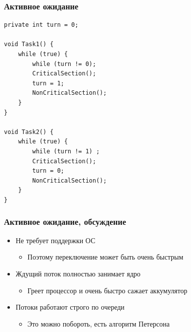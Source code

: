 \documentclass{../../slides-style}
\begin{document}
    \begin{frame}[fragile]
        \frametitle{Активное ожидание}
        \begin{scriptsize}
            \begin{verbatim}
private int turn = 0;

void Task1() {
    while (true) {
        while (turn != 0);
        CriticalSection();
        turn = 1;
        NonCriticalSection();
    }
}

void Task2() {
    while (true) {
        while (turn != 1) ;
        CriticalSection();
        turn = 0;
        NonCriticalSection();
    }
}
            \end{verbatim}
        \end{scriptsize}
    \end{frame}

    \begin{frame}
        \frametitle{Активное ожидание, обсуждение}
        \begin{itemize}
            \item Не требует поддержки ОС
            \begin{itemize}
                \item Поэтому переключение может быть очень быстрым
            \end{itemize}
            \item Ждущий поток полностью занимает ядро
            \begin{itemize}
                \item Греет процессор и очень быстро сажает аккумулятор
            \end{itemize}
            \item Потоки работают строго по очереди
            \begin{itemize}
                \item Это можно побороть, есть алгоритм Петерсона
            \end{itemize}
        \end{itemize}
    \end{frame}
\end{document}
